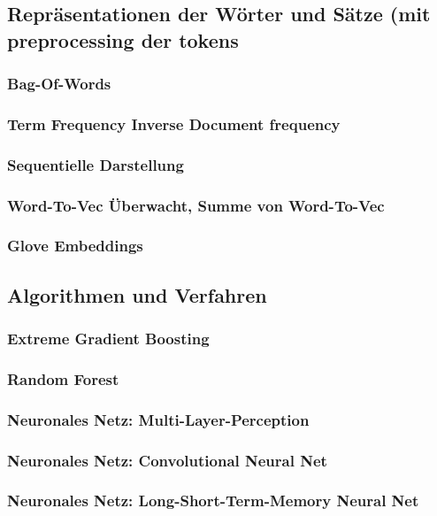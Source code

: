 \documentclass[a4paper,11pt]{article}
\begin{document}
\subsection{Repräsentationen der Wörter und Sätze (mit preprocessing der tokens} \label{kap:3.1Wordemb}
\subsubsection{Bag-Of-Words} \label{Kap:Bow}
\subsubsection{Term Frequency Inverse Document frequency} \label{Kap:Tfidf}
\subsubsection{Sequentielle Darstellung}
\subsubsection{Word-To-Vec Überwacht, Summe von Word-To-Vec}
\subsubsection{Glove Embeddings} \label{Kap:Glove}


\subsection{Algorithmen und Verfahren}

\subsubsection{Extreme Gradient Boosting}
\subsubsection{Random Forest}
\subsubsection{Neuronales Netz: Multi-Layer-Perception}
\subsubsection{Neuronales Netz: Convolutional Neural Net}
\subsubsection{Neuronales Netz: Long-Short-Term-Memory Neural Net}
\end{document}
